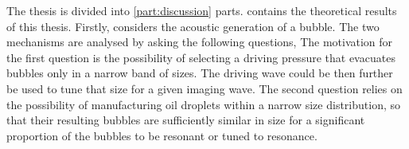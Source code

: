 The thesis is divided into \ref{part:discussion} parts.
%
%
%
%
%
 contains the theoretical results of this thesis.
Firstly,  considers the acoustic generation of a bubble.
The two mechanisms are analysed by asking the following questions,
The motivation for the first question is the possibility 
of selecting a driving pressure that evacuates bubbles only in a narrow band of sizes.
The driving wave could be then further be used to tune that size for a given imaging wave.
The second question relies on the possibility of manufacturing oil droplets
within a narrow size distribution, 
so that their resulting bubbles are sufficiently similar in size 
for a significant proportion of the bubbles to be resonant or tuned to resonance.

